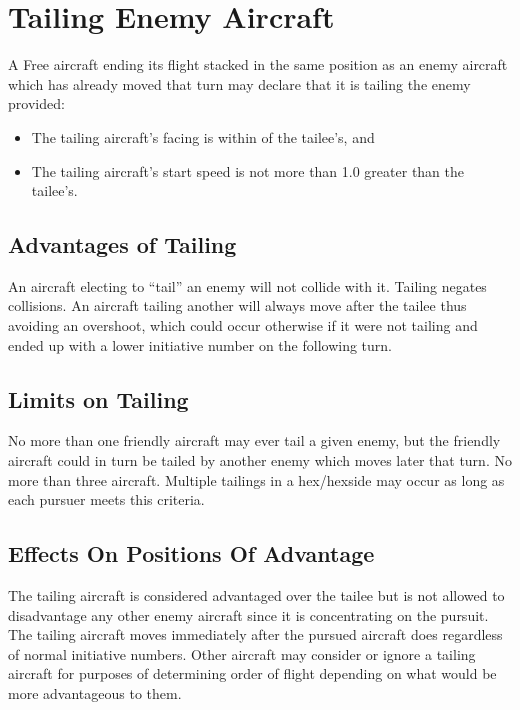 \section{Tailing Enemy Aircraft}
\label{rule:tailing-enemy-aircraft}
\label{rule:tailing}

A Free aircraft ending its flight stacked in the same position as an enemy aircraft which has already moved that turn may declare that it is tailing the enemy provided:

\begin{itemize}

    \item The tailing aircraft's facing is within  of the tailee's, and

    \item The tailing aircraft's start speed is not more than 1.0 greater than the tailee's.

\end{itemize}

\subsection{Advantages of Tailing} An aircraft electing to “tail” an enemy will not collide with it. Tailing negates collisions. An aircraft tailing another will always move after the tailee thus avoiding an overshoot, which could occur otherwise if it were not tailing and ended up with a lower initiative number on the following turn.

\subsection{Limits on Tailing} No more than one friendly aircraft may ever tail a given enemy, but the friendly aircraft could in turn be tailed by another enemy which moves later that turn. No more than three aircraft.  Multiple tailings in a hex/hexside may occur as long as each pursuer meets this criteria.

\subsection{Effects On Positions Of Advantage} The tailing aircraft is considered advantaged over the tailee but is not allowed to disadvantage any other enemy aircraft since it is concentrating on the pursuit. The tailing aircraft moves immediately after the pursued aircraft does regardless of normal initiative numbers. Other aircraft may consider or ignore a tailing aircraft for purposes of determining order of flight depending on what would be more advantageous to them.

